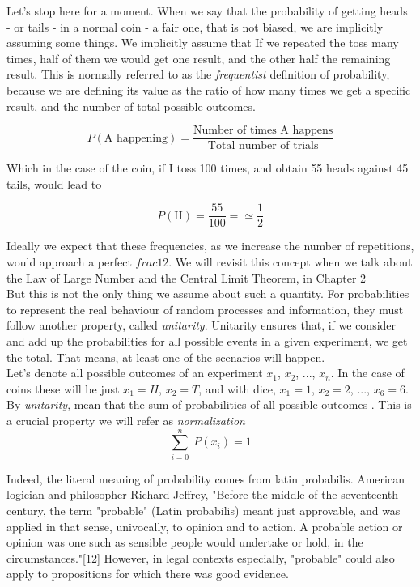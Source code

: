 \documentclass{book}
\begin{document}
Let's stop here for a moment. When we say that the probability of getting heads - or tails - in a normal coin - a fair one, that is not biased, we are implicitly assuming some things. We implicitly assume that If we repeated the toss many times, half of them we would get one result, and the other half the remaining result. This is normally referred to as the \textit{frequentist} definition of probability, because we are defining its value as the ratio of how many times we get a specific result, and the number of total possible outcomes.

\begin{equation}
	P(\text{A happening}) = \frac{\text{Number of times A happens}}{\text{Total number of trials}}
\end{equation}

Which in the case of the coin, if I toss 100 times, and obtain 55 heads against 45 tails, would lead to 

\begin{equation}
	P(\text{H}) = \frac{55}{100} = \simeq \frac{1}{2}
\end{equation}

Ideally we expect that these frequencies, as we increase the number of repetitions, would approach a perfect $frac{1}{2}$. We will revisit this concept when we talk about the Law of Large Number and the Central Limit Theorem, in Chapter 2\\

But this is not the only thing we assume about such a quantity. For probabilities to represent the real behaviour of random processes and information, they must follow another property, called \textit{unitarity}. Unitarity ensures that, if we consider and add up the probabilities for all possible events in a given experiment, we get the total. That means, at least one of the scenarios will happen.\\

Let's denote all possible outcomes of an experiment $x_{1}$, $x_{2}$, ..., $x_{n}$. In the case of coins these will be just $x_{1} = H$, $x_{2} = T$, and with dice, $x_{1} = 1$, $x_{2} = 2$, ..., $x_{6} = 6$. By \textit{unitarity}, mean that the sum of probabilities of all possible outcomes . This is a crucial property we will refer as \textit{normalization}
\begin{equation}
	\sum_{i = 0}^{n} \; P(x_{i}) = 1
\end{equation}

Indeed, the literal meaning of probability comes from latin probabilis. American logician and philosopher Richard Jeffrey, "Before the middle of the seventeenth century, the term "probable" (Latin probabilis) meant just approvable, and was applied in that sense, univocally, to opinion and to action. A probable action or opinion was one such as sensible people would undertake or hold, in the circumstances."[12] However, in legal contexts especially, "probable" could also apply to propositions for which there was good evidence.\\
\end{document}
